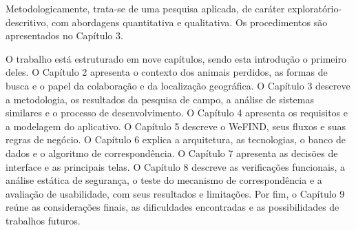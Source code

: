 Metodologicamente, trata-se de uma pesquisa aplicada, de caráter exploratório-descritivo, com abordagens quantitativa e qualitativa. Os procedimentos são apresentados no Capítulo 3.

O trabalho está estruturado em nove capítulos, sendo esta introdução o primeiro deles. O Capítulo 2 apresenta o contexto dos animais perdidos, as formas de busca e o papel da colaboração e da localização geográfica. O Capítulo 3 descreve a metodologia, os resultados da pesquisa de campo, a análise de sistemas similares e o processo de desenvolvimento. O Capítulo 4 apresenta os requisitos e a modelagem do aplicativo. O Capítulo 5 descreve o WeFIND, seus fluxos e suas regras de negócio. O Capítulo 6 explica a arquitetura, as tecnologias, o banco de dados e o algoritmo de correspondência. O Capítulo 7 apresenta as decisões de interface e as principais telas. O Capítulo 8 descreve as verificações funcionais, a análise estática de segurança, o teste do mecanismo de correspondência e a avaliação de usabilidade, com seus resultados e limitações. Por fim, o Capítulo 9 reúne as considerações finais, as dificuldades encontradas e as possibilidades de trabalhos futuros.
